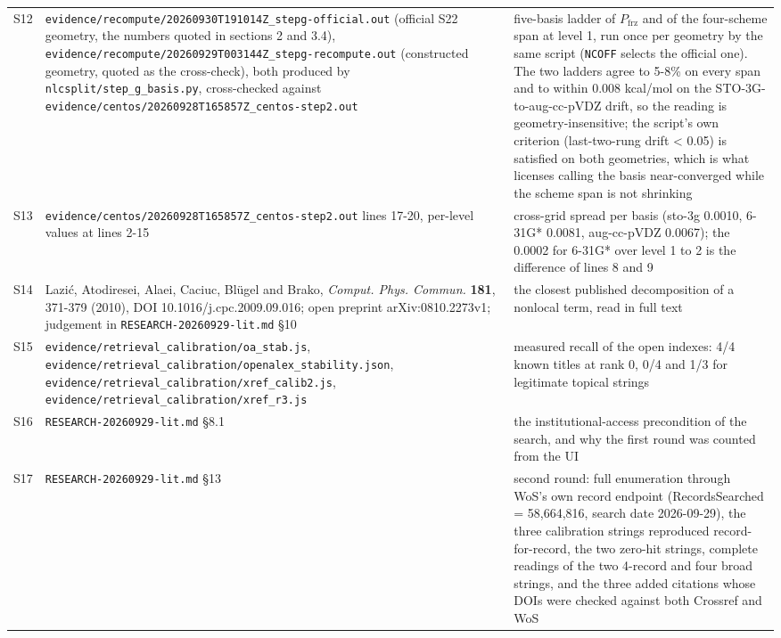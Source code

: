\documentclass[11pt]{article}
\begin{document}
\begin{longtable}{c>{\raggedright\arraybackslash}p{}>{\raggedright\arraybackslash}p{}}
S12 & \texttt{evidence/\allowbreak{}recompute/\allowbreak{}20260930T191014Z\_\allowbreak{}stepg-official.out} (official S22 geometry, the numbers quoted in sections 2 and 3.4), \texttt{evidence/\allowbreak{}recompute/\allowbreak{}20260929T003144Z\_\allowbreak{}stepg-recompute.out} (constructed geometry, quoted as the cross-check), both produced by \texttt{nlcsplit/step\_g\_basis.py}, cross-checked against \texttt{evidence/\allowbreak{}centos/\allowbreak{}20260928T165857Z\_\allowbreak{}centos-step2.out} & five-basis ladder of $P_{\mathrm{frz}}$ and of the four-scheme span at level 1, run once per geometry by the same script (\texttt{NCOFF} selects the official one). The two ladders agree to 5-8\% on every span and to within 0.008 kcal/mol on the STO-3G-to-aug-cc-pVDZ drift, so the reading is geometry-insensitive; the script's own criterion (last-two-rung drift < 0.05) is satisfied on both geometries, which is what licenses calling the basis near-converged while the scheme span is not shrinking \\
S13 & \texttt{evidence/\allowbreak{}centos/\allowbreak{}20260928T165857Z\_\allowbreak{}centos-step2.out} lines 17-20, per-level values at lines 2-15 & cross-grid spread per basis (sto-3g 0.0010, 6-31G* 0.0081, aug-cc-pVDZ 0.0067); the 0.0002 for 6-31G* over level 1 to 2 is the difference of lines 8 and 9 \\
S14 & Lazić, Atodiresei, Alaei, Caciuc, Blügel and Brako, \emph{Comput. Phys. Commun.} \textbf{181}, 371-379 (2010), DOI 10.1016/j.cpc.2009.09.016; open preprint arXiv:0810.2273v1; judgement in \texttt{RESEARCH-20260929-lit.md} \S{}10 & the closest published decomposition of a nonlocal term, read in full text \\
S15 & \texttt{evidence/\allowbreak{}retrieval\_\allowbreak{}calibration/\allowbreak{}oa\_\allowbreak{}stab.js}, \texttt{evidence/\allowbreak{}retrieval\_\allowbreak{}calibration/\allowbreak{}openalex\_\allowbreak{}stability.json}, \texttt{evidence/\allowbreak{}retrieval\_\allowbreak{}calibration/\allowbreak{}xref\_\allowbreak{}calib2.js}, \texttt{evidence/\allowbreak{}retrieval\_\allowbreak{}calibration/\allowbreak{}xref\_\allowbreak{}r3.js} & measured recall of the open indexes: 4/4 known titles at rank 0, 0/4 and 1/3 for legitimate topical strings \\
S16 & \texttt{RESEARCH-20260929-lit.md} \S{}8.1 & the institutional-access precondition of the search, and why the first round was counted from the UI \\
S17 & \texttt{RESEARCH-20260929-lit.md} \S{}13 & second round: full enumeration through WoS's own record endpoint (RecordsSearched = 58,664,816, search date 2026-09-29), the three calibration strings reproduced record-for-record, the two zero-hit strings, complete readings of the two 4-record and four broad strings, and the three added citations whose DOIs were checked against both Crossref and WoS \\

\end{longtable}
\end{document}
